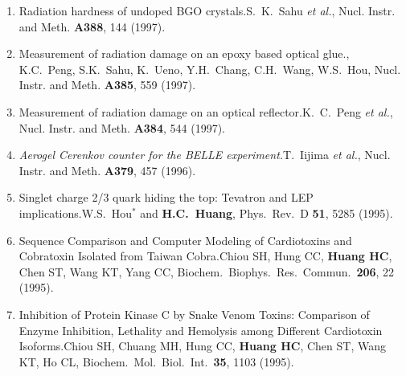 \documentclass[10pt,a4paper]{article}
\def\pub#1#2#3{{\it #1.}\newline #2, #3.}
\def\mypub#1#2#3{{#1.}\newline #2, #3.}
\def\cited#1{Cited $\ge$ #1}
\def\NIM{Nucl. Instr. and Meth. }
\def\etal{{\it et al.}}
\newcommand{\hch}{{\bf H.C.~Huang}}
\begin{document}
\begin{enumerate}
\item 
\mypub{Radiation hardness of undoped BGO crystals}
{S.~K.~Sahu \etal}
{\NIM {\bf A388}, 144 (1997)}


\item 
\mypub{Measurement of radiation damage on an epoxy based optical glue}
{{\bf H.C.~Huang}, K.C.~Peng, S.K.~Sahu, K.~Ueno, Y.H.~Chang,
C.H.~Wang, W.S.~Hou} 
{\NIM {\bf A385}, 559 (1997)}

\item 
\mypub{Measurement of radiation damage on an optical reflector}
{K.~C.~Peng \etal}
{\NIM {\bf A384}, 544 (1997)}

\item \pub{Aerogel Cerenkov counter for the BELLE experiment}
{T.~Iijima \etal}
{\NIM {\bf A379}, 457 (1996)}


\item 
\mypub{Singlet charge 2/3 quark hiding the top: Tevatron and LEP
implications} 
{W.S.~Hou$^{*}$ and \hch}
{Phys.\ Rev.\  D {\bf 51}, 5285 (1995)} %


\item 
\mypub{Sequence Comparison and Computer Modeling of Cardiotoxins
and Cobratoxin Isolated from Taiwan Cobra} 
{Chiou SH, Hung CC, {\bf Huang HC}, Chen ST, Wang KT, Yang CC}
{Biochem.\ Biophys.\ Res.\ Commun.\ {\bf 206}, 22 (1995)}

\item 
\mypub{Inhibition of Protein Kinase C by Snake Venom Toxins:
Comparison of Enzyme Inhibition, Lethality and Hemolysis among
Different Cardiotoxin Isoforms}
{Chiou SH, Chuang MH, Hung CC, {\bf Huang HC}, Chen ST, Wang KT, Ho CL}
{Biochem.\ Mol.\ Biol.\ Int.\ {\bf 35}, 1103 (1995)}


\end{enumerate}
\end{document}
